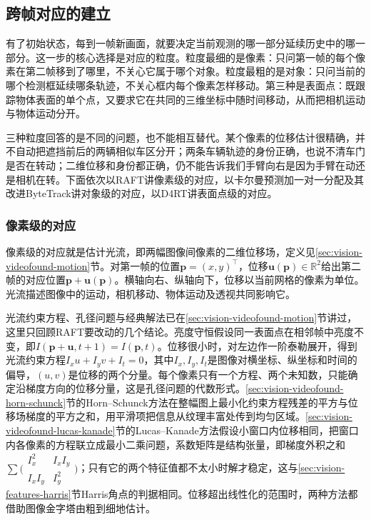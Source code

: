 \subsection{跨帧对应的建立}
\label{sec:vision-video-correspondence}

有了初始状态，每到一帧新画面，就要决定当前观测的哪一部分延续历史中的哪一部分。这一步的核心选择是对应的粒度。粒度最细的是像素：只问第一帧的每个像素在第二帧移到了哪里，不关心它属于哪个对象。粒度最粗的是对象：只问当前的哪个检测框延续哪条轨迹，不关心框内每个像素怎样移动。第三种是表面点：既跟踪物体表面的单个点，又要求它在共同的三维坐标中随时间移动，从而把相机运动与物体运动分开。

三种粒度回答的是不同的问题，也不能相互替代。某个像素的位移估计很精确，并不自动把遮挡前后的两辆相似车区分开；两条车辆轨迹的身份正确，也说不清车门是否在转动；二维位移和身份都正确，仍不能告诉我们手臂向右是因为手臂在动还是相机在转。下面依次以RAFT讲像素级的对应，以卡尔曼预测加一对一分配及其改进ByteTrack讲对象级的对应，以D4RT讲表面点级的对应。

\subsubsection{像素级的对应}
\label{sec:vision-video-raft}

像素级的对应就是估计光流，即两幅图像间像素的二维位移场，定义见\ref{sec:vision-videofound-motion}节。对第一帧的位置$\bm{p}=(x,y)^\top$，位移$\bm{u}(\bm{p})\in\mathbb{R}^{2}$给出第二帧的对应位置$\bm{p}+\bm{u}(\bm{p})$。横轴向右、纵轴向下，位移以当前网格的像素为单位。光流描述图像中的运动，相机移动、物体运动及透视共同影响它。

光流约束方程、孔径问题与经典解法已在\ref{sec:vision-videofound-motion}节讲过，这里只回顾RAFT要改动的几个结论。亮度守恒假设同一表面点在相邻帧中亮度不变，即$I(\bm{p}+\bm{u},t+1)=I(\bm{p},t)$。位移很小时，对左边作一阶泰勒展开，得到光流约束方程$I_xu+I_yv+I_t=0$，其中$I_x,I_y,I_t$是图像对横坐标、纵坐标和时间的偏导，$(u,v)$是位移的两个分量。每个像素只有一个方程、两个未知数，只能确定沿梯度方向的位移分量，这是孔径问题的代数形式。\ref{sec:vision-videofound-horn-schunck}节的Horn--Schunck方法在整幅图上最小化约束方程残差的平方与位移场梯度的平方之和，用平滑项把信息从纹理丰富处传到均匀区域。\ref{sec:vision-videofound-lucas-kanade}节的Lucas--Kanade方法假设小窗口内位移相同，把窗口内各像素的方程联立成最小二乘问题，系数矩阵是结构张量，即梯度外积之和$\sum\bigl(\begin{smallmatrix}I_x^2&I_xI_y\\I_xI_y&I_y^2\end{smallmatrix}\bigr)$；只有它的两个特征值都不太小时解才稳定，这与\ref{sec:vision-features-harris}节Harris角点的判据相同。位移超出线性化的范围时，两种方法都借助图像金字塔由粗到细地估计。


